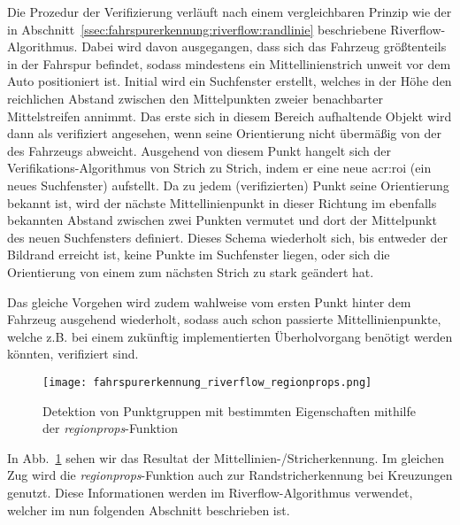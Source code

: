 Die Prozedur der Verifizierung verläuft nach einem vergleichbaren Prinzip wie der in Abschnitt~\ref{ssec:fahrspurerkennung:riverflow:randlinie} beschriebene Riverflow-Algorithmus. Dabei wird davon ausgegangen, dass sich das Fahrzeug größtenteils in der Fahrspur befindet, sodass mindestens ein Mittellinienstrich unweit vor dem Auto positioniert ist. Initial wird ein Suchfenster erstellt, welches in der Höhe den reichlichen Abstand zwischen den Mittelpunkten zweier benachbarter Mittelstreifen annimmt. Das erste sich in diesem Bereich aufhaltende Objekt wird dann als verifiziert angesehen, wenn seine Orientierung nicht übermäßig von der des Fahrzeugs abweicht. Ausgehend von diesem Punkt \glqq hangelt\grqq{} sich der Verifikations-Algorithmus von Strich zu Strich, indem er eine neue \gls{acr:roi} (ein neues Suchfenster) aufstellt. Da zu jedem (verifizierten) Punkt seine Orientierung bekannt ist, wird der nächste Mittellinienpunkt in dieser Richtung im ebenfalls bekannten Abstand zwischen zwei Punkten vermutet und dort der Mittelpunkt des neuen Suchfensters definiert. Dieses Schema wiederholt sich, bis entweder der Bildrand erreicht ist, keine Punkte im Suchfenster liegen, oder sich die Orientierung von einem zum nächsten Strich zu stark geändert hat.

Das gleiche Vorgehen wird zudem wahlweise vom ersten Punkt hinter dem Fahrzeug ausgehend wiederholt, sodass auch schon passierte Mittellinienpunkte, welche z.B. bei einem zukünftig implementierten Überholvorgang benötigt werden könnten, verifiziert sind.

\begin{figure}[ht]
	\centering
	\texttt{[image: fahrspurerkennung\_riverflow\_regionprops.png]}
	\caption{Detektion von Punktgruppen mit bestimmten Eigenschaften mithilfe der \emph{regionprops}-Funktion}
	\label{fig:riverflow:mittellinie:regionprops}
\end{figure}

In Abb.~\ref{fig:riverflow:mittellinie:regionprops} sehen wir das Resultat der Mittellinien-/Stricherkennung. Im gleichen Zug wird die \emph{regionprops}-Funktion auch zur Randstricherkennung bei Kreuzungen genutzt. Diese Informationen werden im Riverflow-Algorithmus verwendet, welcher im nun folgenden Abschnitt beschrieben ist.